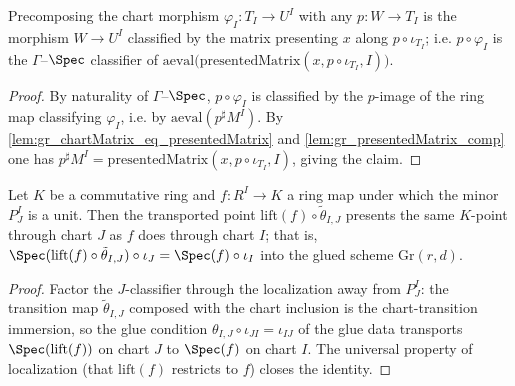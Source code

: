 \begin{lemma}\leanok
  \label{lem:gr_comp_chartMorphism}
  Precomposing the chart morphism \(\varphi_I : T_I \to U^I\) with any \(p : W \to T_I\) is
  the morphism \(W \to U^I\) classified by the matrix presenting \(x\) along
  \(p\circ\iota_{T_I}\); i.e. \(p \circ \varphi_I\) is the \(\Gamma\)--\(\Spec\) classifier of
  \(\mathrm{aeval}\bigl(\mathrm{presentedMatrix}(x, p\circ\iota_{T_I}, I)\bigr)\).
\end{lemma}
\begin{proof}
  By naturality of \(\Gamma\)--\(\Spec\), \(p\circ\varphi_I\) is classified by the \(p\)-image
  of the ring map classifying \(\varphi_I\), i.e. by \(\mathrm{aeval}(p^{\sharp}M^I)\). By
  \cref{lem:gr_chartMatrix_eq_presentedMatrix} and \cref{lem:gr_presentedMatrix_comp} one has
  \(p^{\sharp}M^I = \mathrm{presentedMatrix}(x, p\circ\iota_{T_I}, I)\), giving the claim.
\end{proof}

\begin{lemma}\leanok
  \label{lem:gr_chart_point_eq}
  Let \(K\) be a commutative ring and \(f : R^I \to K\) a ring map under which the minor
  \(P^I_J\) is a unit. Then the transported point
  \(\mathrm{lift}(f)\circ\tilde\theta_{I,J}\) presents the same \(K\)-point through chart
  \(J\) as \(f\) does through chart \(I\); that is,
  \(\Spec(\mathrm{lift}(f)\circ\tilde\theta_{I,J})\circ\iota_J = \Spec(f)\circ\iota_I\) into
  the glued scheme \(\mathrm{Gr}(r,d)\).
\end{lemma}
\begin{proof}

  Factor the \(J\)-classifier through the localization away from \(P^I_J\): the transition map
  \(\tilde\theta_{I,J}\) composed with the chart inclusion is the chart-transition immersion,
  so the glue condition \(\theta_{I,J}\circ\iota_{JI} = \iota_{IJ}\) of the glue data
  transports \(\Spec(\mathrm{lift}(f))\) on chart \(J\) to \(\Spec(f)\) on chart \(I\). The
  universal property of localization (that \(\mathrm{lift}(f)\) restricts to \(f\)) closes the
  identity.
\end{proof}

